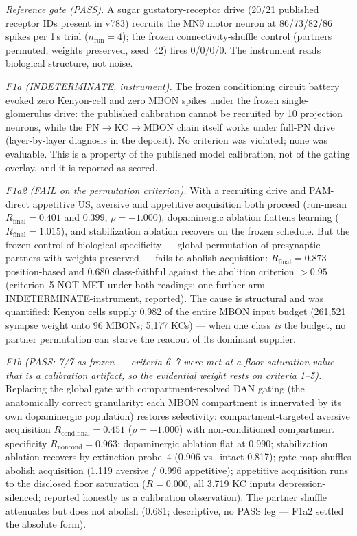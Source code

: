\documentclass[
]{article}
\newcounter{none} %
\begin{document}
\emph{Reference gate (PASS).} A sugar gustatory-receptor drive (20/21
published receptor IDs present in v783) recruits the MN9 motor neuron at
86/73/82/86 spikes per 1 s trial (\(n_\text{run}=4\)); the frozen
connectivity-shuffle control (partners permuted, weights preserved,
seed~42) fires 0/0/0/0. The instrument reads biological structure, not
noise.

\emph{F1a (INDETERMINATE, instrument).} The frozen conditioning circuit
battery evoked zero Kenyon-cell and zero MBON spikes under the frozen
single-glomerulus drive: the published calibration cannot be recruited
by 10 projection neurons, while the PN\(\to\)KC\(\to\)MBON chain itself
works under full-PN drive (layer-by-layer diagnosis in the deposit). No
criterion was violated; none was evaluable. This is a property of the
published model calibration, not of the gating overlay, and it is
reported as scored.

\emph{F1a2 (FAIL on the permutation criterion).} With a recruiting drive
and PAM-direct appetitive US, aversive and appetitive acquisition both
proceed (run-mean \(R_\text{final}=0.401\) and \(0.399\),
\(\rho=-1.000\)), dopaminergic ablation flattens learning
(\(R_\text{final}=1.015\)), and stabilization ablation recovers on the
frozen schedule. But the frozen control of biological specificity ---
global permutation of presynaptic partners with weights preserved ---
fails to abolish acquisition: \(R_\text{final}=0.873\) position-based
and \(0.680\) class-faithful against the abolition criterion \(>0.95\)
(criterion~5 NOT MET under both readings; one further arm
INDETERMINATE-instrument, reported). The cause is structural and was
quantified: Kenyon cells supply 0.982 of the entire MBON input budget
(261,521 synapse weight onto 96 MBONs; 5,177 KCs) --- when one class
\emph{is} the budget, no partner permutation can starve the readout of
its dominant supplier.

\emph{F1b (PASS; 7/7 as frozen --- criteria 6--7 were met at a
floor-saturation value that is a calibration artifact, so the evidential
weight rests on criteria 1--5).} Replacing the global gate with
compartment-resolved DAN gating (the anatomically correct granularity:
each MBON compartment is innervated by its own dopaminergic population)
restores selectivity: compartment-targeted aversive acquisition
\(R_\text{cond,final}=0.451\) (\(\rho=-1.000\)) with non-conditioned
compartment specificity \(R_\text{noncond}=0.963\); dopaminergic
ablation flat at \(0.990\); stabilization ablation recovers by
extinction probe~4 (0.906 vs.~intact 0.817); gate-map shuffles abolish
acquisition (1.119 aversive / 0.996 appetitive); appetitive acquisition
runs to the disclosed floor saturation (\(R=0.000\), all 3,719 KC inputs
depression-silenced; reported honestly as a calibration observation).
The partner shuffle attenuates but does not abolish (0.681; descriptive,
no PASS leg --- F1a2 settled the absolute form).
\end{document}
